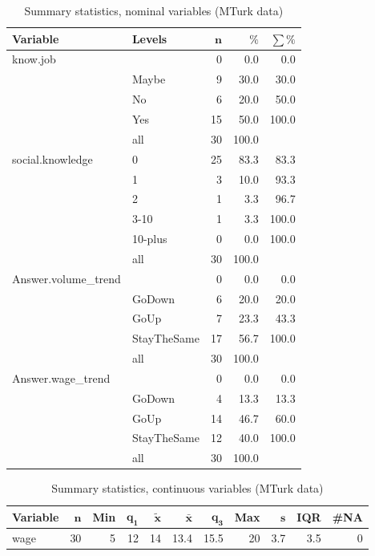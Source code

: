 \documentclass[a4paper,10pt]{article}\usepackage[]{graphicx}\usepackage[]{color}
\begin{document}
\begin{table}[ht]
\centering
{\footnotesize
\begin{tabular}{ll|rrr}
 \textbf{Variable} & \textbf{Levels} & $\mathbf{n}$ & $\mathbf{\%}$ & $\mathbf{\sum \%}$ \\ 
  \hline
know.job &  & 0 & 0.0 & 0.0 \\ 
   & Maybe & 9 & 30.0 & 30.0 \\ 
   & No & 6 & 20.0 & 50.0 \\ 
   & Yes & 15 & 50.0 & 100.0 \\ 
   \hline
 & all & 30 & 100.0 &  \\ 
   \hline
\hline
social.knowledge & 0 & 25 & 83.3 & 83.3 \\ 
   & 1 & 3 & 10.0 & 93.3 \\ 
   & 2 & 1 & 3.3 & 96.7 \\ 
   & 3-10 & 1 & 3.3 & 100.0 \\ 
   & 10-plus & 0 & 0.0 & 100.0 \\ 
   \hline
 & all & 30 & 100.0 &  \\ 
   \hline
\hline
Answer.volume\_trend &  & 0 & 0.0 & 0.0 \\ 
   & GoDown & 6 & 20.0 & 20.0 \\ 
   & GoUp & 7 & 23.3 & 43.3 \\ 
   & StayTheSame & 17 & 56.7 & 100.0 \\ 
   \hline
 & all & 30 & 100.0 &  \\ 
   \hline
\hline
Answer.wage\_trend &  & 0 & 0.0 & 0.0 \\ 
   & GoDown & 4 & 13.3 & 13.3 \\ 
   & GoUp & 14 & 46.7 & 60.0 \\ 
   & StayTheSame & 12 & 40.0 & 100.0 \\ 
   \hline
 & all & 30 & 100.0 &  \\ 
   \hline
\hline
\end{tabular}
}
\caption{Summary statistics, nominal variables (MTurk data)} 
\label{tab1:51-9060}
\end{table}
\begin{table}[ht]
\centering
{\footnotesize
\begin{tabular}{lrrrrrrrrrr}
 \textbf{Variable} & $\mathbf{n}$ & \textbf{Min} & $\mathbf{q_1}$ & $\mathbf{\widetilde{x}}$ & $\mathbf{\bar{x}}$ & $\mathbf{q_3}$ & \textbf{Max} & $\mathbf{s}$ & \textbf{IQR} & \textbf{\#NA} \\ 
  \hline
wage & 30 & 5 & 12 & 14 & 13.4 & 15.5 & 20 & 3.7 & 3.5 & 0 \\ 
  \end{tabular}
}
\caption{Summary statistics, continuous variables (MTurk data)} 
\label{tab2:51-9060}
\end{table}
\end{document}
